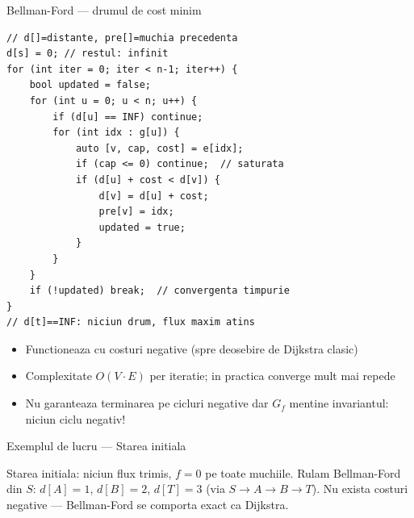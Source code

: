 ﻿\documentclass[9pt]{beamer}
\begin{document}
\begin{frame}[fragile]{Bellman-Ford --- drumul de cost minim}
  \begin{lstlisting}[belowskip=0pt]
// d[]=distante, pre[]=muchia precedenta
d[s] = 0; // restul: infinit
for (int iter = 0; iter < n-1; iter++) {
    bool updated = false;
    for (int u = 0; u < n; u++) {
        if (d[u] == INF) continue;
        for (int idx : g[u]) {
            auto [v, cap, cost] = e[idx];
            if (cap <= 0) continue;  // saturata
            if (d[u] + cost < d[v]) {
                d[v] = d[u] + cost;
                pre[v] = idx;
                updated = true;
            }
        }
    }
    if (!updated) break;  // convergenta timpurie
}
// d[t]==INF: niciun drum, flux maxim atins
  \end{lstlisting}
  \smallskip
  \begin{footnotesize}
  \begin{itemize}\itemsep0pt
    \item Functioneaza cu costuri negative (spre deosebire de Dijkstra clasic)
    \item Complexitate $O(V\cdot E)$ per iteratie; in practica converge mult mai repede
    \item \alert{Nu garanteaza terminarea pe cicluri negative} \textemdash{}
          dar $G_f$ mentine invariantul: niciun ciclu negativ!
  \end{itemize}
  \end{footnotesize}
\end{frame}

\begin{frame}[shrink]{Exemplul de lucru --- Starea initiala}
  \begin{center}
  \end{center}
  \begin{block}{}
    \footnotesize
    Starea initiala: niciun flux trimis, $f=0$ pe toate muchiile.
    Rulam Bellman-Ford din $S$: $d[A]=1$, $d[B]=2$, $d[T]=3$ (via $S\!\to\!A\!\to\!B\!\to\!T$).
    Nu exista costuri negative --- Bellman-Ford se comporta exact ca Dijkstra.
  \end{block}
\end{frame}
\end{document}
